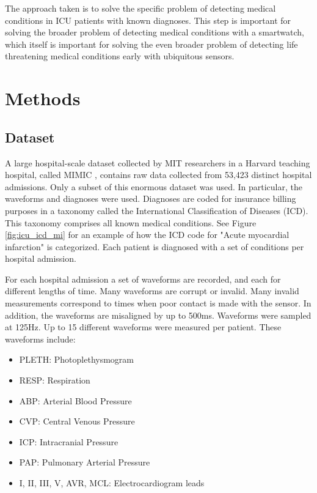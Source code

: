 The approach taken is to solve the specific problem of detecting medical conditions in ICU patients with known diagnoses.  This step is important for solving the broader problem of detecting medical conditions with a smartwatch, which itself is important for solving the even broader problem of detecting life threatening medical conditions early with ubiquitous sensors.

\section{Methods}

\subsection{Dataset}

A large hospital-scale dataset collected by MIT researchers in a Harvard teaching hospital, called MIMIC \cite{johnson2016mimic}, contains raw data collected from 53,423 distinct hospital admissions.  Only a subset of this enormous dataset was used.  In particular, the waveforms and diagnoses were used.  Diagnoses are coded for insurance billing purposes in a taxonomy called the International Classification of Diseases (ICD).  This taxonomy comprises all known medical conditions. See Figure \ref{fig:icu_icd_mi} for an example of how the ICD code for "Acute myocardial infarction" is categorized.  Each patient is diagnosed with a set of conditions per hospital admission.

For each hospital admission a set of waveforms are recorded, and each for different lengths of time.  Many waveforms are corrupt or invalid.  Many invalid measurements correspond to times when poor contact is made with the sensor.  In addition, the waveforms are misaligned by up to 500ms.  Waveforms were sampled at 125Hz.  Up to 15 different waveforms were measured per patient.  These waveforms include:

\begin{itemize}
    \item PLETH: Photoplethysmogram
    \item RESP: Respiration
    \item ABP: Arterial Blood Pressure
    \item CVP: Central Venous Pressure
    \item ICP: Intracranial Pressure
    \item PAP: Pulmonary Arterial Pressure
    \item I, II, III, V, AVR, MCL: Electrocardiogram leads
\end{itemize}

